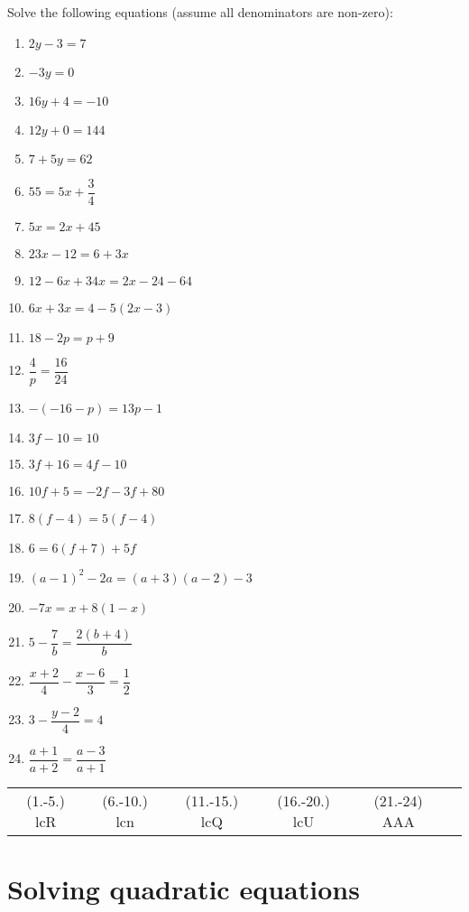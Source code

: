 \begin{exercises}{}
{
Solve the following equations (assume all denominators are non-zero): \\

\begin{multicols}{2}
\begin{enumerate}[itemsep=6pt, label=\textbf{\arabic*}. ] 
\item   $2y-3=7$
\item   $-3y=0$        
\item   $16y+4=-10$        
\item   $12y+0=144$
\item   $7+5y=62$       
\item  $55=5x+\dfrac{3}{4}$ 
\item   $5x=2x+45$        
\item  $23x-12=6+3x$
\item   $12-6x+34x=2x-24-64$
\item   $6x+3x=4-5(2x-3)$
\item   $18-2p=p+9$   
\item   $\dfrac{4}{p}=\dfrac{16}{24}$
\item   $-(-16-p)=13p-1$
\item   $3f-10=10$
\item   $3f+16=4f-10$
\item   $10f+5=-2f-3f+80$
\item   $8(f-4)=5(f-4)$
\item  $6=6(f+7)+5f$      
\item $(a-1)^{2} - 2a = (a+3)(a-2) - 3$
\item $-7x = x+8(1-x)$ 
\item $5-\dfrac{7}{b} = \dfrac{2(b+4)}{b}$
\item $\dfrac{x+2}{4} - \dfrac{x-6}{3} = \dfrac{1}{2}$
\item $ 3 - \dfrac{y-2}{4} = 4$
\item $ \dfrac{a+1}{a+2} = \dfrac{a-3}{a+1}$
  
\end{enumerate}
\end{multicols}
\practiceinfo
\par 
\par \begin{tabular}[h]{cccccc}
(1.-5.) lcR  &  (6.-10.) lcn  &  (11.-15.) lcQ  &  (16.-20.) lcU & (21.-24) AAA\end{tabular}
}
\end{exercises}

\section{Solving quadratic equations}

